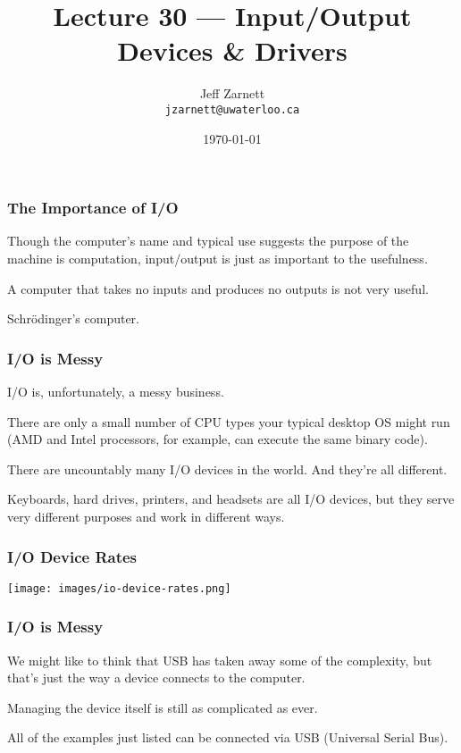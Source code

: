 

\title{Lecture 30 --- Input/Output Devices \& Drivers }

\author{Jeff Zarnett \\ \small \texttt{jzarnett@uwaterloo.ca}}
\date{\today}




\begin{frame}
  \titlepage

 \end{frame}




\begin{frame}
\frametitle{The Importance of I/O}

Though the computer's name and typical use suggests the purpose of the machine is computation, input/output is just as important to the usefulness. 

A computer that takes no inputs and produces no outputs is not very useful.

Schr\"odinger's computer.


\end{frame}

\begin{frame}
\frametitle{I/O is Messy}

I/O is, unfortunately, a messy business. 

There are only a small number of CPU types your typical desktop OS might run (AMD and Intel processors, for example, can execute the same binary code).

There are uncountably many I/O devices in the world. And they're all different. 

Keyboards, hard drives, printers, and headsets are all I/O devices, but they serve very different purposes and work in different ways.


\end{frame}

\begin{frame}
\frametitle{I/O Device Rates}

\begin{center}
	\texttt{[image: images/io-device-rates.png]}
\end{center}


\end{frame}

\begin{frame}
\frametitle{I/O is Messy}

We might like to think that USB has taken away some of the complexity, but that's just the way a device connects to the computer. 

Managing the device itself is still as complicated as ever. 

All of the examples just listed can be connected via USB (Universal Serial Bus). 


\end{frame}

